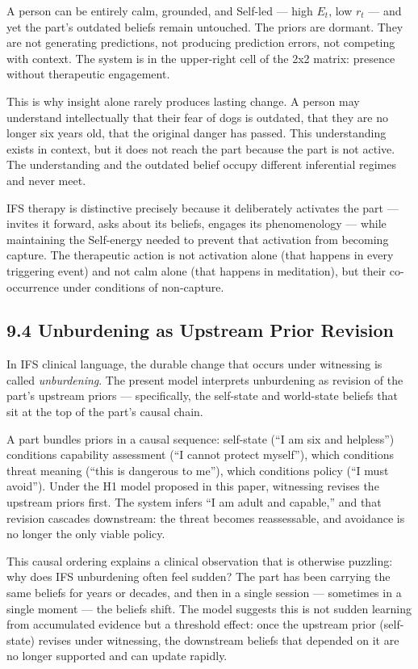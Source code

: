 \documentclass[11pt]{article}
\begin{document}
A person can be entirely calm, grounded, and Self-led --- high \(E_t\),
low \(r_t\) --- and yet the part's outdated beliefs remain untouched.
The priors are dormant. They are not generating predictions, not
producing prediction errors, not competing with context. The system is
in the upper-right cell of the 2x2 matrix: presence without therapeutic
engagement.

This is why insight alone rarely produces lasting change. A person may
understand intellectually that their fear of dogs is outdated, that they
are no longer six years old, that the original danger has passed. This
understanding exists in context, but it does not reach the part because
the part is not active. The understanding and the outdated belief occupy
different inferential regimes and never meet.

IFS therapy is distinctive precisely because it deliberately activates
the part --- invites it forward, asks about its beliefs, engages its
phenomenology --- while maintaining the Self-energy needed to prevent
that activation from becoming capture. The therapeutic action is not
activation alone (that happens in every triggering event) and not calm
alone (that happens in meditation), but their co-occurrence under
conditions of non-capture.

\subsection{9.4 Unburdening as Upstream Prior
Revision}\label{unburdening-as-upstream-prior-revision}

In IFS clinical language, the durable change that occurs under
witnessing is called \emph{unburdening}. The present model interprets
unburdening as revision of the part's upstream priors --- specifically,
the self-state and world-state beliefs that sit at the top of the part's
causal chain.

A part bundles priors in a causal sequence: self-state (``I am six and
helpless'') conditions capability assessment (``I cannot protect
myself''), which conditions threat meaning (``this is dangerous to
me''), which conditions policy (``I must avoid''). Under the H1 model
proposed in this paper, witnessing revises the upstream priors first.
The system infers ``I am adult and capable,'' and that revision cascades
downstream: the threat becomes reassessable, and avoidance is no longer
the only viable policy.

This causal ordering explains a clinical observation that is otherwise
puzzling: why does IFS unburdening often feel sudden? The part has been
carrying the same beliefs for years or decades, and then in a single
session --- sometimes in a single moment --- the beliefs shift. The
model suggests this is not sudden learning from accumulated evidence but
a threshold effect: once the upstream prior (self-state) revises under
witnessing, the downstream beliefs that depended on it are no longer
supported and can update rapidly.
\end{document}
